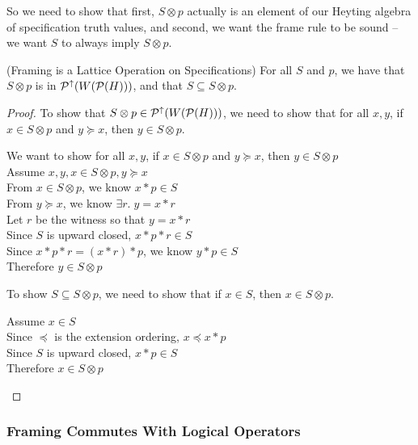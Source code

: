 So we need to show that first, $S \otimes p$ actually is an element of
our Heyting algebra of specification truth values, and second, we want
the frame rule to be sound -- we want $S$ to always imply $S \otimes
p$.

\begin{lemma}{(Framing is a Lattice Operation on Specifications)}
For all $S$ and $p$, we have that $S \otimes p$ is in $\mathcal{P}^{\uparrow}({W(\mathcal{P}(H)}))$,
and that $S \subseteq S \otimes p $.
\end{lemma}
\begin{proof}
To show that $S \otimes p \in \mathcal{P}^{\uparrow}({W(\mathcal{P}(H))})$, we need to show that for all 
$x,y$, if $x \in S \otimes p$ and $y \succeq x$, then $y \in S \otimes p$. 

\begin{tabbedproof}
\oo We want to show for all $x,y$, if $x \in S \otimes p$ and $y \succeq x$, then $y \in S \otimes p$ \\
\oo Assume $x, y, x \in S \otimes p, y \succeq x$ \\
\ooo From $x \in S \otimes p$, we know $x * p \in S$ \\
\ooo From $y \succeq x$, we know $\exists r.\; y = x * r$ \\
\ooo Let $r$ be the witness so that $y = x * r$ \\
\oooo Since $S$ is upward closed, $x * p * r \in S$ \\
\oooo Since $x * p * r = (x * r) *p$, we know  $y * p \in S$ \\
\oooo Therefore $y \in S \otimes p$ \\
\end{tabbedproof}

\noindent To show $S \subseteq S \otimes p$, we need to show that if $x \in S$, then $x \in S \otimes p$. 
\begin{tabbedproof}
\oo Assume $x \in S$ \\
\ooo Since $\preceq$ is the extension ordering, $x \preceq x * p$ \\   
\ooo Since $S$ is upward closed, $x * p \in S$\\
\ooo Therefore $x \in S \otimes p$ 
\end{tabbedproof}
\end{proof}

\subsubsection{Framing Commutes With Logical Operators}

